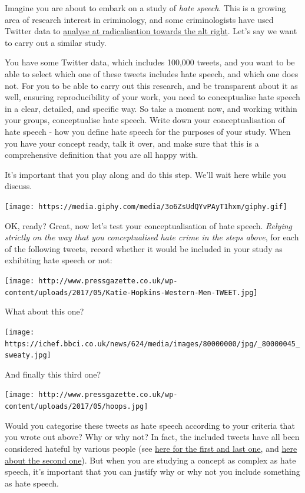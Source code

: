 \documentclass[
]{book}
\begin{document}
Imagine you are about to embark on a study of \emph{hate speech}. This is a growing area of research interest in criminology, and some criminologists have used Twitter data to \href{https://www.washingtonpost.com/news/the-intersect/wp/2016/09/26/these-charts-show-exactly-how-racist-and-radical-the-alt-right-has-gotten-this-year/?noredirect=on\&utm_term=.aeb311ab060c}{analyse at radicalisation towards the alt right}. Let's say we want to carry out a similar study.

You have some Twitter data, which includes 100,000 tweets, and you want to be able to select which one of these tweets includes hate speech, and which one does not. For you to be able to carry out this research, and be transparent about it as well, ensuring reproducibility of your work, you need to conceptualise hate speech in a clear, detailed, and specific way. So take a moment now, and working within your groups, conceptualise hate speech. Write down your conceptualisation of hate speech - how you define hate speech for the purposes of your study. When you have your concept ready, talk it over, and make sure that this is a comprehensive definition that you are all happy with.

It's important that you play along and do this step. We'll wait here while you discuss.

\texttt{[image: https://media.giphy.com/media/3o6ZsUdQYvPAyT1hxm/giphy.gif]}

OK, ready? Great, now let's test your conceptualisation of hate speech. \emph{Relying strictly on the way that you conceptualised hate crime in the steps above}, for each of the following tweets, record whether it would be included in your study as exhibiting hate speech or not:

\texttt{[image: http://www.pressgazette.co.uk/wp-content/uploads/2017/05/Katie-Hopkins-Western-Men-TWEET.jpg]}

What about this one?

\texttt{[image: https://ichef.bbci.co.uk/news/624/media/images/80000000/jpg/\_80000045\_sweaty.jpg]}

And finally this third one?

\texttt{[image: http://www.pressgazette.co.uk/wp-content/uploads/2017/05/hoops.jpg]}

Would you categorise these tweets as hate speech according to your criteria that you wrote out above? Why or why not? In fact, the included tweets have all been considered hateful by various people (see \href{http://www.pressgazette.co.uk/katie-hopkins-leaving-lbc-radio-effective-immediately-station-announces/}{here for the first and last one}, and \href{http://www.bbc.co.uk/news/uk-scotland-glasgow-west-30641705}{here about the second one}). But when you are studying a concept as complex as hate speech, it's important that you can justify why or why not you include something as hate speech.
\end{document}
